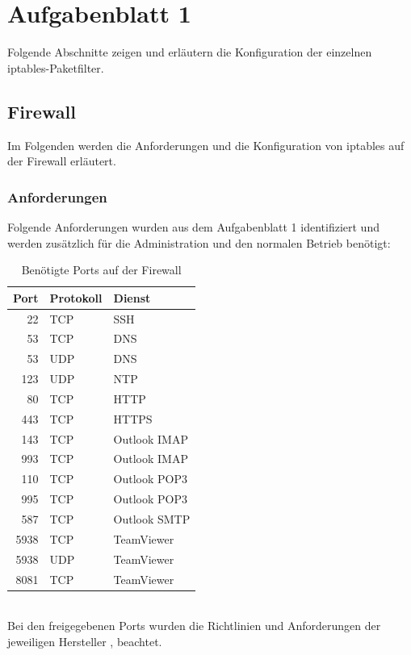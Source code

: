 \documentclass[
    a4paper,
    pagesize,
	pdftex,
    12pt,
]{scrartcl}
\begin{document}
\newpage
\section{Aufgabenblatt 1}

Folgende Abschnitte zeigen und erläutern die Konfiguration der einzelnen iptables-Paketfilter.

\subsection{Firewall}\label{config-firewall-fw}
Im Folgenden werden die Anforderungen und die Konfiguration von iptables auf der Firewall erläutert.

\subsubsection{Anforderungen}
Folgende Anforderungen wurden aus dem Aufgabenblatt 1 identifiziert und werden zusätzlich für die Administration und den normalen Betrieb benötigt:
\begin{table}[h!]
	\begin{center}
		\label{tab:table3}
		\begin{tabular}{ r | l | l }
			\textbf{Port} & \textbf{Protokoll} & \textbf{Dienst} \\
			\hline
			22 & TCP & SSH \\
			53 & TCP & DNS \\
			53 & UDP & DNS \\
			123 & UDP & NTP \\
			80 & TCP & HTTP \\
			443 & TCP & HTTPS \\
			143 & TCP & Outlook IMAP \\
			993 & TCP & Outlook IMAP \\
			110 & TCP & Outlook POP3 \\
			995 & TCP & Outlook POP3 \\
			587 & TCP & Outlook SMTP \\
			5938 & TCP & TeamViewer \\
			5938 & UDP & TeamViewer \\
			8081 & TCP & TeamViewer \\
		\end{tabular}
		\caption{Benötigte Ports auf der Firewall}
	\end{center}
\end{table}
\\
Bei den freigegebenen Ports wurden die Richtlinien und Anforderungen der jeweiligen Hersteller \cite{ashaiyengar-2023}, \cite{teamviewer-2024} beachtet. \\ \\
\end{document}
